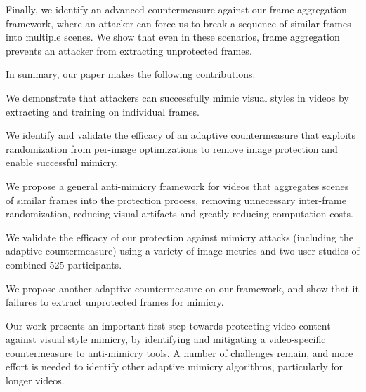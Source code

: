 Finally, we identify an advanced countermeasure against our frame-aggregation
framework, where an attacker can force us to break a sequence of similar
frames into multiple scenes. We show that even in these scenarios, frame
aggregation prevents an attacker from extracting unprotected frames. 

In summary, our paper makes the following contributions:
\begin{packed_itemize}
  \item We demonstrate that attackers can successfully mimic visual
    styles in videos by extracting and training on individual frames.
  \item We identify and validate the efficacy of an adaptive countermeasure
    that exploits randomization from per-image optimizations to remove image
    protection and enable successful mimicry.
  \item We propose a general anti-mimicry framework for videos that 
    aggregates scenes of similar frames into the protection process, removing
    unnecessary inter-frame randomization, reducing visual artifacts and
    greatly reducing computation costs.
  \item We validate the efficacy of our protection against mimicry attacks
    (including the adaptive countermeasure) using a variety of image metrics
    and two user studies of combined 525 participants.
  \item We propose another adaptive countermeasure on our framework,
    and show that it failures to extract unprotected frames for mimicry.
\end{packed_itemize}

Our work presents an important first step towards protecting video content
against visual style mimicry, by identifying and mitigating a video-specific
countermeasure to anti-mimicry tools. A number of challenges remain, and more
effort is needed to identify other adaptive mimicry algorithms, particularly
for longer videos. 